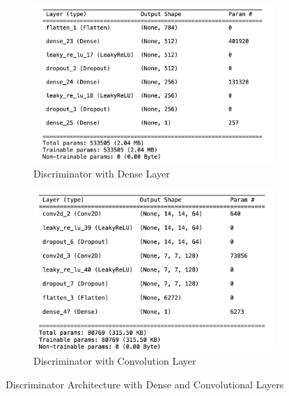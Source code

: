 \begin{figure}[H]
    \centering
    \begin{subfigure}[b]{0.45\linewidth}
        \centering
        \includegraphics[width=\linewidth]{./Images/discriminator_dense.jpg}
        \caption{Discriminator with Dense Layer}
        \label{fig:disc_dense}
    \end{subfigure}
    \hspace{0.05\linewidth}
    \begin{subfigure}[b]{0.45\linewidth}
        \centering
        \includegraphics[width=\linewidth]{./Images/discriminator_cnn.jpg}
        \caption{Discriminator with Convolution Layer}
        \label{fig:disc_conv}
    \end{subfigure}
    \caption{Discriminator Architecture with Dense and Convolutional Layers}
    \label{fig:disc_architecture}
\end{figure}


